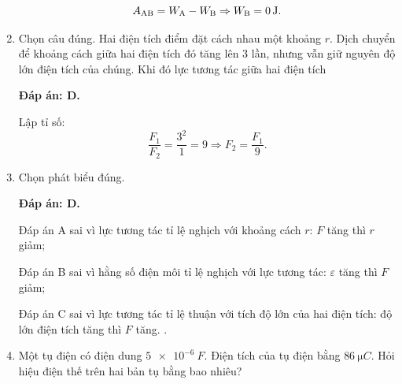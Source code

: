 \begin{enumerate}[label=\bfseries Câu \arabic*:]
{	$$A_\text{AB} = W_\text A - W_\text B \Rightarrow W_\text B = \SI{0}{J}.$$
	}
	\item {}
	
	\cauhoi
	{Chọn câu đúng. Hai điện tích điểm đặt cách nhau một khoảng $r$. Dịch chuyển để khoảng cách giữa hai điện tích đó tăng lên 3 lần, nhưng vẫn giữ nguyên độ lớn điện tích của chúng. Khi đó lực tương tác giữa hai điện tích
		
	}
	\loigiai
	{	\textbf{Đáp án: D.}
		
		Lập tỉ số:
		$$\dfrac{F_1}{F_2} = \dfrac{3^2}{1} = 9 \Rightarrow F_2 = \dfrac{F_1}{9}.$$
	}
	\item {}
	
	\cauhoi
	{Chọn phát biểu đúng.
		
	}
	\loigiai
	{	\textbf{Đáp án: D.}
		
		Đáp án A sai vì lực tương tác tỉ lệ nghịch với khoảng cách $r$: $F$ tăng thì $r$ giảm;
		
		Đáp án B sai vì hằng số điện môi tỉ lệ nghịch với lực tương tác: $\varepsilon$ tăng thì $F$ giảm;
		
		Đáp án C sai vì lực tương tác tỉ lệ thuận với tích độ lớn của hai điện tích: độ lớn điện tích tăng thì $F$ tăng.
		.
	}
	\item {}
	
	\cauhoi
	{Một tụ điện có điện dung $\SI{5e-6}{F}$. Điện tích của tụ điện bằng $\SI{86}{\micro C}$. Hỏi hiệu điện thế trên hai bản tụ bằng bao nhiêu?
		
}
\end{enumerate}
